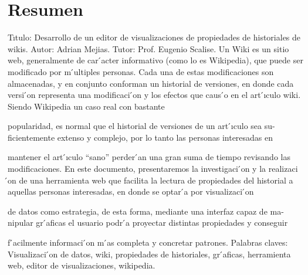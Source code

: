 \section*{Resumen}

Tıtulo:
Desarrollo de un editor de visualizaciones de propiedades de historiales de
wikis.
Autor:
Adrian Mejias.
Tutor:
Prof. Eugenio Scalise.
Un Wiki es un sitio web, generalmente de car ́acter informativo (como lo es
Wikipedia), que puede ser modificado por m ́ultiples personas. Cada una de
estas modificaciones son almacenadas, y en conjunto conforman un historial
de versiones, en donde cada versi ́on representa una modificaci ́on y los efectos
que caus ́o en el art ́ıculo wiki. Siendo Wikipedia un caso real con bastante

popularidad, es normal que el historial de versiones de un art ́ıculo sea su-
ficientemente extenso y complejo, por lo tanto las personas interesadas en

mantener el art ́ıculo “sano” perder ́an una gran suma de tiempo revisando
las modificaciones. En este documento, presentaremos la investigaci ́on y la
realizaci ́on de una herramienta web que facilita la lectura de propiedades del
historial a aquellas personas interesadas, en donde se optar ́a por visualizaci ́on

de datos como estrategia, de esta forma, mediante una interfaz capaz de ma-
nipular gr ́aficas el usuario podr ́a proyectar distintas propiedades y conseguir

f ́acilmente informaci ́on m ́as completa y concretar patrones.
Palabras claves:
Visualizaci ́on de datos, wiki, propiedades de historiales, gr ́aficas, herramienta
web, editor de visualizaciones, wikipedia.



